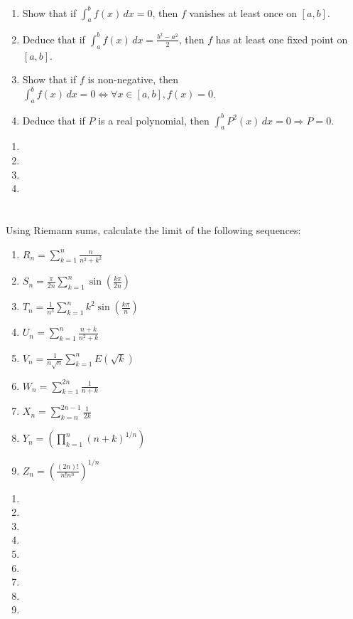\documentclass[12pt]{article}
\begin{document}
\begin{enumerate}
	\item Show that if $\int_a^b f(x) \, dx = 0$, then $f$ vanishes at least once on $[a, b]$.
	\item Deduce that if $\int_a^b f(x) \, dx = \frac{b^2 - a^2}{2}$, then $f$ has at least one fixed point on $[a, b]$.
	\item Show that if $f$ is non-negative, then $\int_a^b f(x) \, dx = 0 \Leftrightarrow \forall x \in [a, b], f(x) = 0$.
	\item Deduce that if $P$ is a real polynomial, then $\int_a^b P^2(x) \, dx = 0 \Rightarrow P = 0$.
\end{enumerate}

\begin{correctionbox}
	\begin{enumerate}
		\item
		\item
		\item
		\item
	\end{enumerate}
\end{correctionbox}

\section{}
Using Riemann sums, calculate the limit of the following sequences:

\begin{enumerate}
	\item $R_n = \sum_{k=1}^{n} \frac{n}{n^2 + k^2}$
	\item $S_n = \frac{\pi}{2n} \sum_{k=1}^{n} \sin\left(\frac{k\pi}{2n}\right)$
	\item $T_n = \frac{1}{n^3} \sum_{k=1}^{n} k^2 \sin\left(\frac{k\pi}{n}\right)$
	\item $U_n = \sum_{k=1}^{n} \frac{n+k}{n^2 + k}$
	\item $V_n = \frac{1}{n\sqrt{n}} \sum_{k=1}^{n} E(\sqrt{k})$
	\item $W_n = \sum_{k=1}^{2n} \frac{1}{n+k}$
	\item $X_n = \sum_{k=n}^{2n-1} \frac{1}{2k}$
	\item $Y_n = \left(\prod_{k=1}^{n} (n+k)^{1/n}\right)$
	\item $Z_n = \left(\frac{(2n)!}{n!n^n}\right)^{1/n}$
\end{enumerate}

\begin{correctionbox}
	\begin{enumerate}
		\item
		\item
		\item
		\item
		\item
		\item
		\item
		\item
		\item
	\end{enumerate}
\end{correctionbox}


\end{document}
